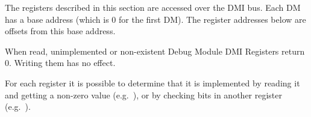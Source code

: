 The registers described in this section are accessed over the DMI bus.  Each DM
has a base address (which is 0 for the first DM). The register addresses below
are offsets from this base address.

When read, unimplemented or non-existent Debug Module DMI Registers return 0.
Writing them has no effect.

For each register it is possible to determine that it is implemented by reading
it and getting a non-zero value (e.g.\ \RdmSbcs), or by checking bits in another
register (e.g.\ \FdmAbstractcsProgbufsize).


